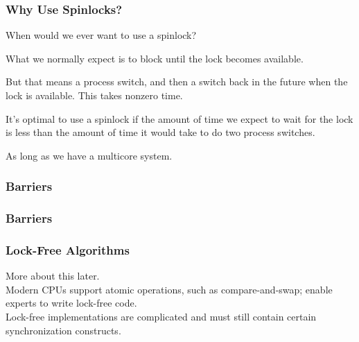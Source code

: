 \begin{frame}
\frametitle{Why Use Spinlocks?}

When would we ever want to use a spinlock?

What we normally expect is to block until the lock becomes available. 

But that means a process switch, and then a switch back in the future when the lock is available.  This takes nonzero time. 

It's optimal to use a spinlock if the amount of time we expect to wait for the lock is less than the amount of time it would take to do two process switches. 

As long as we have a multicore system.

\end{frame}

\begin{frame}
  \frametitle{Barriers}

  \begin{center}
    
  \end{center}

\end{frame}

\begin{frame}
  \frametitle{Barriers}

  \begin{center}
    
  \end{center}

\end{frame}

\begin{frame}
  \frametitle{Lock-Free Algorithms}


    More about this later.\\[1em]

    Modern CPUs support atomic operations, such as compare-and-swap;
enable experts to write lock-free code.\\[1em]

    Lock-free implementations are complicated and must still contain certain synchronization constructs.

\end{frame}

